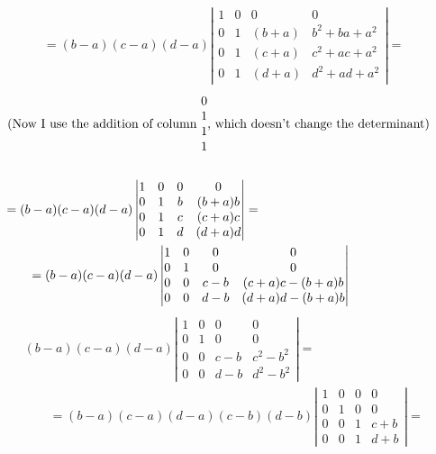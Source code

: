 \documentclass[twoside]{amsart}
\theoremstyle{plain}
\theoremstyle{definition}
\begin{document}
\begin{enumerate}
\[\begin{aligned}
      & = (b-a)(c-a)(d-a) \left| \begin{matrix} 1 & 0 & 0 & 0 \\ 0 & 1 & (b+a) & b^2 + ba +a^2 \\ 0 & 1 & (c+a) & c^2 + ac + a^2 \\ 0 & 1 & (d+a) & d^2 + ad + a^2 \end{matrix} \right| = 
\end{aligned}
\]
\[
\begin{aligned}
      &  \text{ (Now I use the addition of column $ \begin{matrix} 0 \\ 1 \\ 1 \\ 1 \end{matrix} $, which doesn't change the determinant) } \\
 &   \quad \\ 
      & = (b-a)(c-a)(d-a) \left| \begin{matrix} 1 & 0 & 0 & 0 \\ 0 & 1 & b & (b+a)b \\ 0 & 1 & c & (c+a)c \\ 0 & 1 & d & (d+a)d \end{matrix} \right|  = \\
    & \quad \quad = (b-a)(c-a)(d-a) \left| \begin{matrix} 1 & 0 & 0 & 0 \\ 0 & 1  & 0 & 0 \\ 0 & 0 & c-b & (c+a)c - (b+a)b \\ 0 & 0 & d- b & (d+a)d - (b+a)b \end{matrix} \right| \\
\end{aligned}
\]
\[
\begin{aligned}
      & (b-a)(c-a)(d-a) \left| \begin{matrix} 1 & 0 & 0 & 0 \\ 0 & 1 & 0 & 0 \\ 0 & 0 & c-b & c^2 - b^2 \\ 0 & 0 & d-b & d^2 - b^2 \end{matrix} \right| = \\
    & \quad \quad = (b-a)(c-a)(d-a)(c-b)(d-b)\left| \begin{matrix} 1 & 0 & 0 & 0 \\ 0 & 1 & 0 & 0 \\ 0 & 0 & 1 & c+b \\ 0 & 0 & 1 & d+b \end{matrix} \right| = \\

\end{aligned}\]
\end{enumerate}
\end{document}
